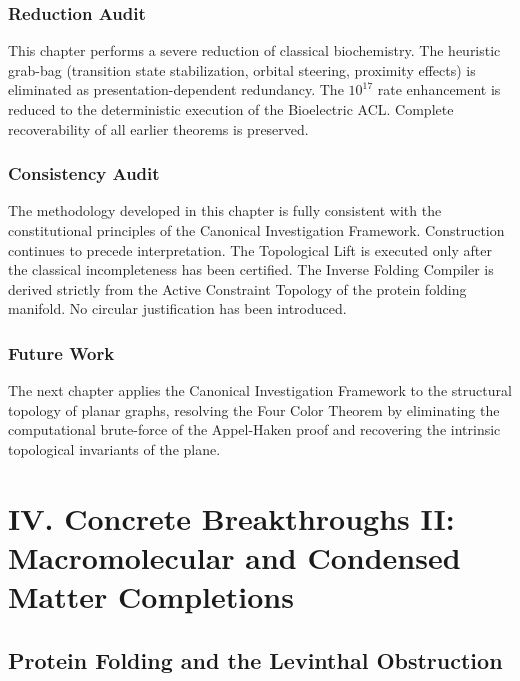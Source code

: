 \documentclass[11pt,openany]{extbook}
\newenvironment{reductionaudit}{\section*{Reduction Audit}}{}
\newenvironment{consistencyaudit}{\section*{Consistency Audit}}{}
\newenvironment{futurework}{\section*{Future Work}}{}
\theoremstyle{plain}
\theoremstyle{definition}
\begin{document}
\begin{reductionaudit}
\noindent This chapter performs a severe reduction of classical biochemistry. The heuristic grab-bag (transition state stabilization, orbital steering, proximity effects) is eliminated as presentation-dependent redundancy. The $10^{17}$ rate enhancement is reduced to the deterministic execution of the Bioelectric ACL. Complete recoverability of all earlier theorems is preserved.
\end{reductionaudit}

\begin{consistencyaudit}
\noindent The methodology developed in this chapter is fully consistent with the constitutional principles of the Canonical Investigation Framework. Construction continues to precede interpretation. The Topological Lift is executed only after the classical incompleteness has been certified. The Inverse Folding Compiler is derived strictly from the Active Constraint Topology of the protein folding manifold. No circular justification has been introduced.
\end{consistencyaudit}

\begin{futurework}
\noindent The next chapter applies the Canonical Investigation Framework to the structural topology of planar graphs, resolving the Four Color Theorem by eliminating the computational brute-force of the Appel-Haken proof and recovering the intrinsic topological invariants of the plane.
\end{futurework}

\part{IV. Concrete Breakthroughs II: Macromolecular and Condensed Matter Completions}

\chapter{Protein Folding and the Levinthal Obstruction}

\end{document}
